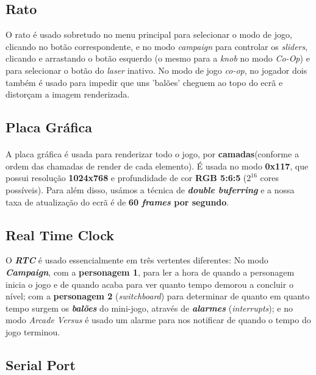 \documentclass{report}
\begin{document}
\subsection{Rato}


O rato é usado sobretudo no menu principal para selecionar o modo de jogo, clicando no botão correspondente, e no modo \textit{campaign} para controlar os \textit{sliders}, clicando e arrastando o botão esquerdo (o mesmo para a \textit{knob} no modo \textit{Co-Op}) e para selecionar o botão do \textit{laser} inativo.  
No modo de jogo \textit{co-op}, no jogador dois também é usado para impedir que uns 'balões' cheguem ao topo do ecrã e distorçam a imagem renderizada.

\subsection{Placa Gráfica}

\paragraph{}
A placa gráfica é usada para renderizar todo o jogo, por \textbf{camadas}(conforme a ordem das chamadas de render de cada elemento). É usada no modo \textbf{0x117}, que possui resolução \textbf{1024x768} e profundidade de cor \textbf{RGB 5:6:5} ($2^{16}$ cores possíveis).
Para além disso, usámos a técnica de \textbf{\textit{double buferring}} e a nossa taxa de atualização do ecrã é de \textbf{60 \textit{frames} por segundo}.

\subsection{Real Time Clock}

O \textbf{\textit{RTC}} é usado essencialmente em três vertentes diferentes: No modo \textbf{\textit{Campaign}}, com a \textbf{personagem 1}, para ler a hora de quando a personagem inicia o jogo e de quando acaba para ver quanto tempo demorou a concluir o nível; com a \textbf{personagem 2} (\textit{switchboard}) para determinar de quanto em quanto tempo surgem os \textbf{\textit{balões}} do mini-jogo, através de \textbf{\textit{alarmes}} (\textit{interrupts}); e no modo \textit{Arcade Versus} é usado um alarme para nos notificar de quando o tempo do jogo terminou.

\subsection{Serial Port}
\end{document}

